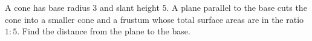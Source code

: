 A cone has base radius $3$ and slant height $5$. A plane parallel to the base cuts the cone into a smaller cone and a frustum whose total surface areas are in the ratio $1:5$. Find the distance from the plane to the base.
